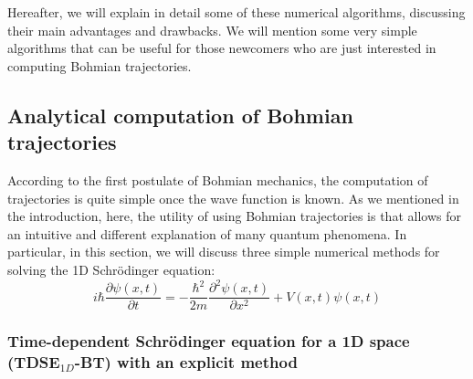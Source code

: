 \documentclass[nofootinbib, secnumarabic, amsmath, nobibnotes,11pt,aps,pra, floatfix]{revtex4-1}
\begin{document}
Hereafter, we will explain in detail some of these numerical
algorithms, discussing their main advantages and drawbacks. We will
mention some very simple algorithms that can be useful for those
newcomers who are just interested in computing Bohmian trajectories.\enlargethispage{-1pc}

\subsection{Analytical computation of Bohmian trajectories}

According to the first postulate of Bohmian mechanics, the
computation of trajectories is quite simple once the wave function
is known.  As we mentioned in the introduction, here, the utility of
using Bohmian trajectories is that allows for an intuitive and different
explanation of many quantum phenomena. In particular, in this
section, we will discuss three simple numerical methods for
solving the 1D Schr\"odinger equation:
\begin{equation}
\label{om.Schrodinger1Dappendix}
i \hbar \frac{\partial \psi(x,t)} {\partial t} = -\frac {\hbar^2} {2m} \frac{ {\partial}^2 \psi(x,t)} {\partial x^2} + V(x,t) \psi(x,t)
\end{equation}

\subsubsection{Time-dependent Schr\"odinger equation for a 1D space (TDSE$_{1D}$-BT) with an explicit method}
\label{timedependentexplicit}
\end{document}
